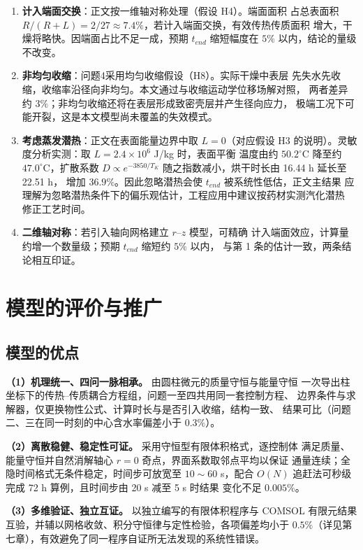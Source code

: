 \documentclass[12pt,a4paper]{article}
\begin{document}
\begin{center}
\begin{enumerate}
\item \textbf{计入端面交换}：正文按一维轴对称处理（假设 H4）。端面面积
占总表面积 $R/(R+L)=2/27\approx7.4\%$，若计入端面交换，有效传热传质面积
增大，干燥将略快。因端面占比不足一成，预期 $t_{end}$ 缩短幅度在 $5\%$
以内，结论的量级不改变。
\item \textbf{非均匀收缩}：问题4采用均匀收缩假设（H8）。实际干燥中表层
先失水先收缩，收缩率沿径向非均匀。本文通过与收缩运动学位移场解对照，
两者差异约 $3\%$；非均匀收缩还将在表层形成致密壳层并产生径向应力，
极端工况下可能开裂，这是本文模型尚未覆盖的失效模式。
\item \textbf{考虑蒸发潜热}：正文在表面能量边界中取 $L=0$（对应假设
H3 的说明）。灵敏度分析实测：取 $L=2.4\times10^6$ J/kg 时，表面平衡
温度由约 $50.2^\circ$C 降至约 $47.0^\circ$C，扩散系数 $D\propto
e^{-3850/T_K}$ 随之指数减小，烘干时长由 16.44 h 延长至 22.51 h，
增加 $36.9\%$。因此忽略潜热会使 $t_{end}$ 被系统性低估，正文主结果
应理解为忽略潜热条件下的偏乐观估计，工程应用中建议按药材实测汽化潜热
修正工艺时间。
\item \textbf{二维轴对称}：若引入轴向网格建立 $r$--$z$ 模型，可精确
计入端面效应，计算量约增一个数量级；预期 $t_{end}$ 缩短约 $5\%$ 以内，
与第 1 条的估计一致，两条结论相互印证。
\end{enumerate}
\section{模型的评价与推广}

\subsection{模型的优点}
\textbf{（1）机理统一、四问一脉相承。} 由圆柱微元的质量守恒与能量守恒
一次导出柱坐标下的传热--传质耦合方程组，问题一至四共用同一套控制方程、
边界条件与求解器，仅更换物性公式、计算时长与是否引入收缩，结构一致、
结果可比（问题二、三在同一时刻的中心含水率偏差小于 $0.3\%$）。

\textbf{（2）离散稳健、稳定性可证。} 采用守恒型有限体积格式，逐控制体
满足质量、能量守恒并自然消解轴心 $r=0$ 奇点，界面系数取邻点平均以保证
通量连续；全隐时间格式无条件稳定，时间步可放宽至 $10\sim60$ s，配合
$O(N)$ 追赶法可秒级完成 72 h 算例，且时间步由 20 s 减至 5 s 时结果
变化不足 $0.005\%$。

\textbf{（3）多维验证、独立互证。} 以独立编写的有限体积程序与 COMSOL
有限元结果互验，并辅以网格收敛、积分守恒律与定性检验，各项偏差均小于
$0.5\%$（详见第七章），有效避免了同一程序自证所无法发现的系统性错误。


\end{center}
\end{document}
